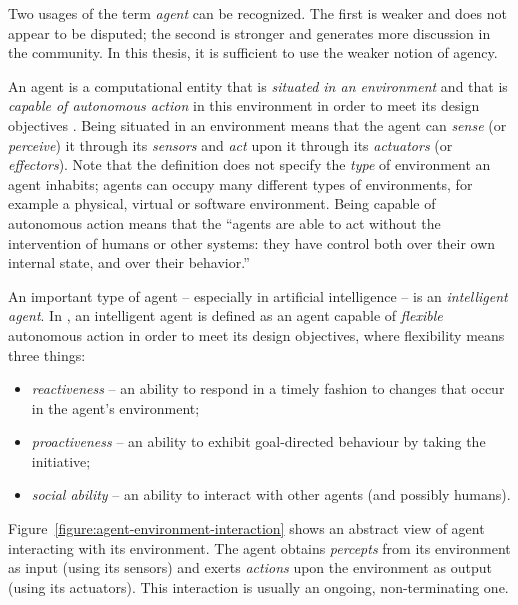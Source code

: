 Two usages of the term \textit{agent} can be recognized.
The first is weaker and does not appear to be disputed; the second is stronger and generates more discussion in the community.
In this thesis, it is sufficient to use the weaker notion of agency.

An agent is a computational entity that is \textit{situated in an environment} and that is \textit{capable of autonomous action} in this environment in order to meet its design objectives \cite{Wooldridge02}.
Being situated in an environment means that the agent can \textit{sense} (or \textit{perceive}) it through its \textit{sensors} and \textit{act} upon it through its \textit{actuators} (or \textit{effectors}).
Note that the definition does not specify the \textit{type} of environment an agent inhabits; agents can occupy many different types of environments, for example a physical, virtual or software environment.
Being capable of autonomous action means that the ``agents are able to act without the intervention of humans or other systems: they have control both over their own internal state, and over their behavior.'' \cite{Wooldridge02}

An important type of agent -- especially in artificial intelligence -- is an \textit{intelligent agent}.
In \cite{Wooldridge02}, an intelligent agent is defined as an agent capable of \textit{flexible} autonomous action in order to meet its design objectives, where flexibility means three things:
\begin{itemize}
	\item \textit{reactiveness} -- an ability to respond in a timely fashion to changes that occur in the agent's environment;
	\item \textit{proactiveness} -- an ability to exhibit goal-directed behaviour by taking the initiative;
	\item \textit{social ability} -- an ability to interact with other agents (and possibly humans).
\end{itemize}

Figure~\ref{figure:agent-environment-interaction} shows an abstract view of agent interacting with its environment.
The agent obtains \textit{percepts} from its environment as input (using its sensors) and exerts \textit{actions} upon the environment as output (using its actuators).
This interaction is usually an ongoing, non-terminating one.

